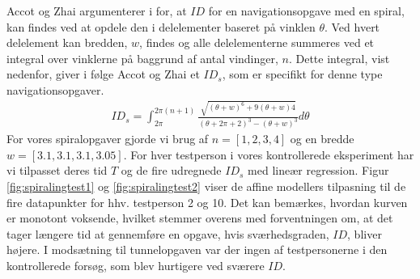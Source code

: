 Accot og Zhai argumenterer i \cite{accot1997} for, at $ID$ for en navigationsopgave med en spiral, kan findes ved at opdele den i delelementer baseret på vinklen $\theta$. Ved hvert delelement kan bredden, $w$, findes og alle delelementerne summeres ved et integral over vinklerne på baggrund af antal vindinger, $n$. Dette integral, vist nedenfor, giver i følge Accot og Zhai et $ID_s$, som er specifikt for denne type navigationsopgaver. 
\begin{align*}
ID_s = \int_{2\pi}^{2\pi(n+1)}\frac{\sqrt{\left(\theta+w\right)^6+9\left(\theta+w\right)4}}{\left(\theta+2\pi+2\right)^3-\left(\theta+w\right)^3}d\theta
\end{align*}
For vores spiralopgaver gjorde vi brug af $n=[1,2,3,4]$ og en bredde $w=[3.1,3.1,3.1,3.05]$. For hver testperson i vores kontrollerede eksperiment har vi tilpasset deres tid $T$ og de fire udregnede $ID_s$ med lineær regression. Figur \ref{fig:spiralingtest1} og \ref{fig:spiralingtest2} viser de affine modellers tilpasning til de fire datapunkter for hhv. testperson 2 og 10. Det kan bemærkes, hvordan kurven er monotont voksende, hvilket stemmer overens med forventningen om, at det tager længere tid at gennemføre en opgave, hvis sværhedsgraden, $ID$, bliver højere. I modsætning til tunnelopgaven var der ingen af testpersonerne i den kontrollerede forsøg, som blev hurtigere ved sværere $ID$.

